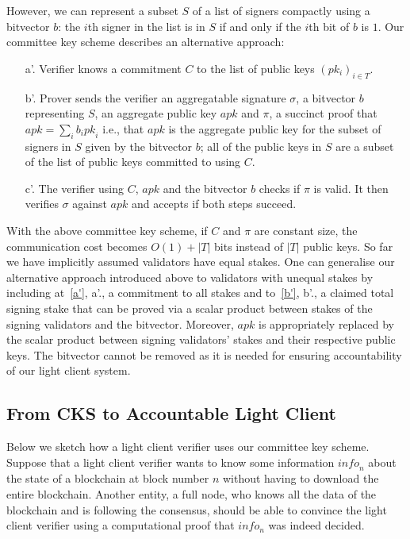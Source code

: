 \noindent However, we can represent a subset $S$ of a list of signers compactly using a bitvector $b$: 
the $i$th signer in the list is in $S$ if and only if the $i$th bit of $b$ is $1$. Our committee key scheme describes an alternative approach:

\begin{itemize}
\item[a'.]\label{a'} Verifier knows a commitment $C$ to the list of public keys $(pk_i)_{i \in T}$.

\item[b'.]\label{b'} Prover sends the verifier an aggregatable signature $\sigma$, a bitvector $b$ representing $S$, an aggregate public key 
$\mathit{apk}$ and $\pi$, a succinct proof that $\mathit{apk}=\sum_i b_i \mathit{pk}_i$ i.e., 
that $\mathit{apk}$ is the aggregate public key for the subset of signers in $S$ given by the bitvector $b$; all of the public keys in $S$ are a subset 
of the list of public keys committed to using $C$.

\item[c'.] The verifier using $C$, $\mathit{apk}$ and the bitvector $b$ checks if $\pi$ is valid. 
It then verifies $\sigma$ against $\mathit{apk}$ and accepts if both steps succeed.
\end{itemize}

\noindent With the above committee key scheme, if $C$ and $\pi$ are constant size, 
the communication cost becomes $O(1)+|T|$ bits instead of $|T|$ public keys. {\color{red} So far we have implicitly assumed validators have equal stakes. 
One can generalise our alternative approach introduced above to validators with unequal stakes by including at~\ref{a'}, a'.,  a commitment to all stakes 
and to~\ref{b'}, b'., a claimed total signing stake that can be proved via a scalar product between stakes of the signing validators and 
the bitvector. Moreover, $\mathit{apk}$ is appropriately replaced by the scalar product between signing validators' stakes and their 
respective public keys. The bitvector cannot be removed as it is needed for ensuring accountability of our light client system.}

\subsection{From CKS to Accountable Light Client}
\label{sec_intro_committee}

Below we sketch how a light client verifier uses our committee key scheme. Suppose that a light client verifier wants to know some information $\mathit{info}_n$ about the state of a blockchain at block number $n$ without having to download the entire blockchain. Another entity, a full node, who knows all the data of the blockchain and is following the consensus, should be able to convince the light client verifier using a computational proof that $info_n$ was indeed decided.

